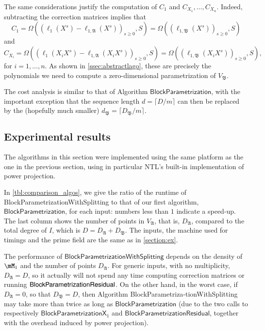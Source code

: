 \documentclass[final,1p,times,authoryear]{elsarticle}
\newcommand{\mainalgoname}{\mathsf{ BlockParametrization}}
\newcommand{\lf}{X}
\begin{document}
The same considerations justify the computation of $C_1$ and
$C_{X_1},\dots,C_{X_n}$. Indeed, subtracting the correction matrices
implies that 
$$C_1 = \Omega( (\ell_1(\lf^s)-\ell_{1,\mathfrak{A}}(\lf^s))_{s \ge 0}, S) =  \Omega( (\ell_{1,\mathfrak{B}}(\lf^s))_{s \ge 0}, S)$$
and
$$C_{X_i} = \Omega( (\ell_1(X_i \lf^s)-\ell_{1,\mathfrak{A}}(X_i \lf^s))_{s \ge 0}, S) =  \Omega( (\ell_{1,\mathfrak{B}}(X_i\lf^s))_{s \ge 0}, S),$$
for $i=1,\dots,n$. As shown in \cref{ssec:abstractlago}, these are precisely 
the polynomials we need to compute a zero-dimensional parametrization
of $V_\mathfrak{B}$.

The cost analysis is similar to that of Algorithm $\mainalgoname$,
with the important exception that the sequence length $d=\lceil
D/m\rceil$ can then be replaced by the (hopefully much smaller)
$d_\mathfrak{B}=\lceil D_\mathfrak{B}/m\rceil$.



\subsection{Experimental results}

The algorithms in this section were implemented using the same
platform as the one in the previous section, using in particular NTL's
built-in implementation of power projection.

In \cref{tbl:comparison_algos}, we give the ratio of the runtime of
{\sf Block\-Parametrization\-WithSplitting} to that of our first
algorithm, $\mainalgoname$, for each input: numbers less than $1$
indicate a speed-up.  The last column shows the number of points in
$V_\mathfrak{A}$, that is, $D_\mathfrak{A}$, compared to the total
degree of $I$, which is $D=D_\mathfrak{A}+D_\mathfrak{B}$. The inputs,
the machine used for timings and the prime field are the same as in
\cref{section:ex}.

The performance of $\mathsf{BlockParametrizationWithSplitting}$
depends on the density of $\mM_1$ and the number of points
$D_\mathfrak{A}$. For generic inputs, with no multiplicity,
$D_\mathfrak{A}=D$, so it actually will not spend any time
computing correction matrices or running $\mainalgoname{\sf
Residual}$. On the other hand, in the worst case, if
$D_\mathfrak{A}=0$, so that $D_\mathfrak{B}=D$, then Algorithm
{\sf BlockParametriza}{\sf -tionWithSplitting} may take more than twice as
long as $\mainalgoname$ (due to the two calls to respectively
$\mathsf{BlockParametrizationX}_1$ and
$\mathsf{BlockParametrizationResidual}$, together with the overhead induced 
by power projection).
\end{document}
